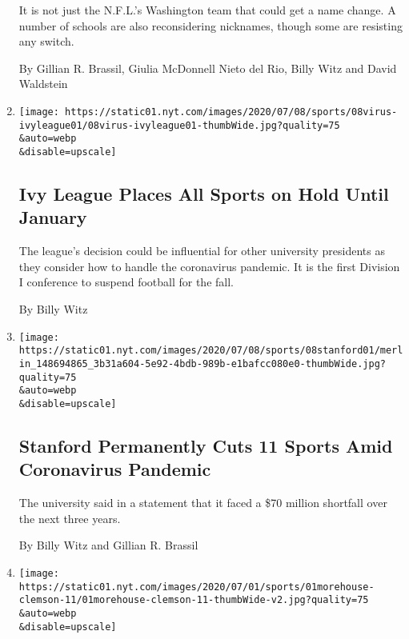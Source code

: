 \begin{enumerate}
  It is not just the N.F.L.'s Washington team that could get a name
  change. A number of schools are also reconsidering nicknames, though
  some are resisting any switch.

  By Gillian R. Brassil, Giulia McDonnell Nieto del Rio, Billy Witz and
  David Waldstein
\item
  \href{/2020/07/08/sports/ncaafootball/ivy-league-fall-sports-football-coronavirus.html}{}

  \texttt{[image: https://static01.nyt.com/images/2020/07/08/sports/08virus-ivyleague01/08virus-ivyleague01-thumbWide.jpg?quality=75\\\&auto=webp\\\&disable=upscale]}

  \hypertarget{ivy-league-places-all-sports-on-hold-until-january}{%
  \subsection{Ivy League Places All Sports on Hold Until
  January}\label{ivy-league-places-all-sports-on-hold-until-january}}

  The league's decision could be influential for other university
  presidents as they consider how to handle the coronavirus pandemic. It
  is the first Division I conference to suspend football for the fall.

  By Billy Witz
\item
  \href{/2020/07/08/sports/coronavirus-stanford-cuts.html}{}

  \texttt{[image: https://static01.nyt.com/images/2020/07/08/sports/08stanford01/merlin\_148694865\_3b31a604-5e92-4bdb-989b-e1bafcc080e0-thumbWide.jpg?quality=75\\\&auto=webp\\\&disable=upscale]}

  \hypertarget{stanford-permanently-cuts-11-sports-amid-coronavirus-pandemic}{%
  \subsection{Stanford Permanently Cuts 11 Sports Amid Coronavirus
  Pandemic}\label{stanford-permanently-cuts-11-sports-amid-coronavirus-pandemic}}

  The university said in a statement that it faced a \$70 million
  shortfall over the next three years.

  By Billy Witz and Gillian R. Brassil
\item
  \href{/2020/07/01/sports/ncaafootball/coronavirus-college-football-hbcus-clemson.html}{}

  \texttt{[image: https://static01.nyt.com/images/2020/07/01/sports/01morehouse-clemson-11/01morehouse-clemson-11-thumbWide-v2.jpg?quality=75\\\&auto=webp\\\&disable=upscale]}


\end{enumerate}
